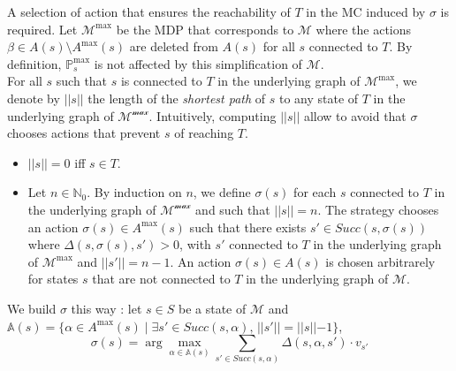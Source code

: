 A selection of action that ensures
the reachability of $T$ in the
MC induced by $\sigma$ is required.
Let $\mathcal{M}^{\max}$ be the MDP that corresponds to $\mathcal{M}$
where the actions $\beta \in A(s) \setminus A^{\max}(s)$ are deleted from $A(s)$
for all $s$ connected to $T$.
By definition, $\mathbb{P}^{\max}_s$ is not affected by this simplification of
$\mathcal{M}$. \\

For all $s$ such that $s$ is connected to $T$ in the underlying graph of
$\mathcal{M}^{\max}$, we denote by $||s||$ the length of the \textit{shortest path} of $s$ to any state of $T$ in the underlying graph of
$\mathcal{M^{\max}}$. Intuitively, computing $||s||$ allow to avoid that $\sigma$ chooses
actions that prevent $s$ of reaching $T$.
\begin{itemize}
	\renewcommand{\labelitemi}{\tiny$\bullet$}
	\item $||s|| = 0$ iff $s \in T$.
	\item Let $n \in \mathbb{N}_0$. By induction on $n$, we define
		$\sigma(s)$ for each $s$ connected to $T$ in the underlying graph of
		$\mathcal{M^{\max}}$ and such that $||s|| = n$.
		The strategy chooses an action $\sigma(s) \in A^{\max}(s)$ such that there exists $s' \in Succ(s, \sigma(s))$ where $\Delta(s, \sigma(s), s') > 0$, with $s'$ connected to $T$ in the underlying graph of
		$\mathcal{M}^{\max}$ and $||s'|| = n - 1$. An action $\sigma(s) \in A(s)$ is chosen
		arbitrarely for states $s$ that are not connected to $T$ in the underlying graph of $\mathcal{M}$.
\end{itemize}
We build $\sigma$ this way : let $s \in S$ be a state of $\mathcal{M}$ and $\mathbb{A}(s) = \{\alpha \in A^{\max}(s) \; | \; \exists s' \in Succ(s,
	\alpha), \, ||s'|| = ||s|| - 1 \}$,
\[
	\sigma(s) = \arg \max_{\alpha \in \mathbb{A}(s)} \sum_{s' \in Succ(s, \alpha)} \Delta(s,
	\alpha, s') \cdot v_{s'}
\]
